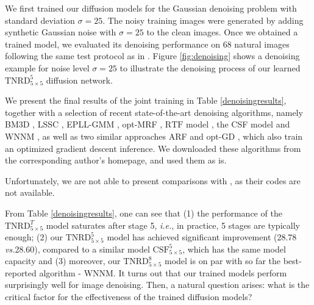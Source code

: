 \documentclass[10pt,journal,compsoc]{IEEEtran}
\newcommand{\ie}{\emph{i.e.}}
\newcommand{\vs}{\emph{vs.}}
\begin{document}
We first trained our diffusion models for the Gaussian denoising problem with standard deviation $\sigma = 25$. The 
noisy training images were generated by adding synthetic Gaussian noise with $\sigma = 25$ to the clean images. 
Once we obtained a trained model, we evaluated its denoising performance on 68 natural images following the same 
test protocol as in \cite{CSF2014, ChenPRB13}. 
Figure \ref{fig:denoising} shows a denoising example for noise level $\sigma = 25$ 
to illustrate the 
denoising process of our learned $\text{TNRD}_{5 \times 5}^5$ diffusion network.

We present the final results of the joint training 
in Table \ref{denoisingresults}, together with a selection of recent state-of-the-art denoising algorithms, 
namely BM3D \cite{BM3D}, LSSC \cite{LSSC}, EPLL-GMM \cite{EPLL}, opt-MRF \cite{ChenPRB13}, $\text{RTF}$ model 
\cite{ECCV2012RTF}, the CSF model \cite{CSF2014} and WNNM \cite{WNNM}, as well as 
two similar approaches ARF \cite{Barbu2009} and opt-GD \cite{DomkeAISTATS2012}, 
which also train an optimized gradient descent inference. 
We downloaded 
these algorithms from the corresponding author's homepage, and used them as is. 
\begin{comment}
\footnote{The implementation of the 
$\text{RTF}^5$ model is not available, and we quoted its result from \cite{CSF2014}.}
\end{comment}
Unfortunately, we are not able to present comparisons with 
\cite{liu2010learning, CNNdenoising}, as their codes are not available.

\begin{comment}
Concerning the performance of our $\text{TNRD}_{5 \times 5}^T$ models, we find that joint training usually leads to 
an improvement of about 0.1dB in the cases of $T \geq 5$. 
\end{comment}


From Table \ref{denoisingresults}, one can see that 
(1) the performance of the $\text{TNRD}_{5 \times 5}^T$ model saturates 
after stage 5, \ie, in practice, 5 stages are typically enough; (2) our 
$\text{TNRD}_{5 \times 5}^5$ model has achieved significant improvement (28.78 \vs 28.60), 
compared to a similar model $\text{CSF}_{5 \times 5}^5$, which has the same model capacity and 
(3) moreover, our $\text{TNRD}_{5 \times 5}^8$ model is on par with so far the best-reported algorithm - WNNM. It turns out that our trained models perform 
surprisingly well 
for image denoising. Then, 
a natural question arises: what is the critical factor for the effectiveness 
of the trained diffusion models? 
\end{document}
